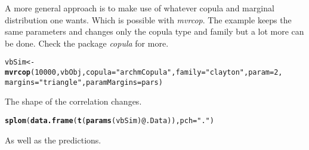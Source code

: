\documentclass[a4paper,english,10pt]{article}\usepackage[]{graphicx}\usepackage[]{color}
\makeatletter
\newcommand{\hlnum}[1]{\textcolor[rgb]{0.686,0.059,0.569}{#1}}%
\newcommand{\hlstr}[1]{\textcolor[rgb]{0.192,0.494,0.8}{#1}}%
\newcommand{\hlopt}[1]{\textcolor[rgb]{0,0,0}{#1}}%
\newcommand{\hlstd}[1]{\textcolor[rgb]{0.345,0.345,0.345}{#1}}%
\newcommand{\hlkwb}[1]{\textcolor[rgb]{0.69,0.353,0.396}{#1}}%
\newcommand{\hlkwc}[1]{\textcolor[rgb]{0.333,0.667,0.333}{#1}}%
\newcommand{\hlkwd}[1]{\textcolor[rgb]{0.737,0.353,0.396}{\textbf{#1}}}%
\newenvironment{kframe}{%
 \def\at@end@of@kframe{}%
 \ifinner\ifhmode%
  \def\at@end@of@kframe{\end{minipage}}%
  \begin{minipage}{\columnwidth}%
 \fi\fi%
 \def\FrameCommand##1{\hskip\@totalleftmargin \hskip-\fboxsep
 \colorbox{shadecolor}{##1}\hskip-\fboxsep
     \hskip-\linewidth \hskip-\@totalleftmargin \hskip\columnwidth}%
 \MakeFramed {\advance\hsize-\width
   \@totalleftmargin\z@ \linewidth\hsize
   \@setminipage}}%
 {\par\unskip\endMakeFramed%
 \at@end@of@kframe}
\newenvironment{knitrout}{}{} %
\makeatother
\begin{document}
A more general approach is to make use of whatever copula and marginal distribution one wants. Which is possible with \emph{mvrcop}. The example keeps the same parameters and changes only the copula type and family but a lot more can be done. Check the package \emph{copula} for more. 

\begin{knitrout}
\color{fgcolor}\begin{kframe}
\begin{alltt}
\hlstd{vbSim} \hlkwb{<-} \hlkwd{mvrcop}\hlstd{(}\hlnum{10000}\hlstd{, vbObj,} \hlkwc{copula} \hlstd{=} \hlstr{"archmCopula"}\hlstd{,} \hlkwc{family} \hlstd{=} \hlstr{"clayton"}\hlstd{,} \hlkwc{param} \hlstd{=} \hlnum{2}\hlstd{,}
    \hlkwc{margins} \hlstd{=} \hlstr{"triangle"}\hlstd{,} \hlkwc{paramMargins} \hlstd{= pars)}
\end{alltt}


{\ttfamily\noindent\bfseries\color{errorcolor}{\#\# Error: object of type 'closure' is not subsettable}}\end{kframe}
\end{knitrout}


The shape of the correlation changes.

\begin{knitrout}
\color{fgcolor}\begin{kframe}
\begin{alltt}
\hlkwd{splom}\hlstd{(}\hlkwd{data.frame}\hlstd{(}\hlkwd{t}\hlstd{(}\hlkwd{params}\hlstd{(vbSim)}\hlopt{@}\hlkwc{.Data}\hlstd{)),} \hlkwc{pch} \hlstd{=} \hlstr{"."}\hlstd{)}
\end{alltt}


{\ttfamily\noindent\bfseries\color{errorcolor}{\#\# Error: error in evaluating the argument 'x' in selecting a method for function 'splom': Error in t(params(vbSim)@.Data) : \\\#\#\ \  error in evaluating the argument 'x' in selecting a method for function 't': Error in params(vbSim) : \\\#\#\ \  error in evaluating the argument 'object' in selecting a method for function 'params': Error: object 'vbSim' not found\\\#\# Calls: data.frame -> t}}\end{kframe}
\end{knitrout}


As well as the predictions.
\end{document}
